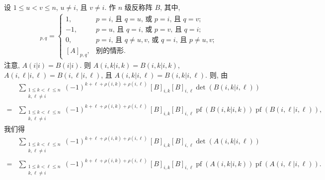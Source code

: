 \documentclass[../libro.tex]{subfiles}
\begin{document}
\begin{example}
    设 \(1 \leq u < v \leq n\),
    \(u \neq i\), 且 \(v \neq i\).
    作 \(n\) 级反称阵 \(B\),
    其中,
    \begin{align*}
        [B]_{p,q} =
        \begin{cases}
            1,
            & \text{\(p = i\), 且 \(q = u\),
            或 \(p = i\), 且 \(q = v\)};       \\
            -1,
            & \text{\(p = u\), 且 \(q = i\),
            或 \(p = v\), 且 \(q = i\)};       \\
            0,
            & \text{\(p = i\), 且 \(q \neq u, v\),
            或 \(q = i\), 且 \(p \neq u, v\)}; \\
            [A]_{p,q},
            & \text{别的情形}.
        \end{cases}
    \end{align*}
    注意, \(A(i|i) = B(i|i)\).
    则
    \(A({i,k}|{i,k}) = B({i,k}|{i,k})\),
    \(A({i,\ell}|{i,\ell}) = B({i,\ell}|{i,\ell})\),
    且
    \(A({i,k}|{i,\ell}) = B({i,k}|{i,\ell})\).
    则, 由
    \begin{align*}
        &
        \sum_{\substack{
                1 \leq k < \ell \leq n \\
        k, \ell \neq i}}
        {(-1)^{k+\ell+\rho(i,k)+\rho(i,\ell)}\,
        [B]_{i,k} [B]_{i,\ell} \det {(B({i,k}|{i,\ell}))}}
        \\
        = {} &
        \sum_{\substack{
                1 \leq k < \ell \leq n \\
        k, \ell \neq i}}
        {
            (-1)^{k+\ell+\rho(i,k)+\rho(i,\ell)}\,
            [B]_{i,k} [B]_{i,\ell}
            \operatorname{pf} {(B({i,k}|{i,k}))}
            \operatorname{pf} {(B({i,\ell}|{i,\ell}))}
        },
    \end{align*}
    我们得
    \begin{align*}
        &
        \sum_{\substack{
                1 \leq k < \ell \leq n \\
        k, \ell \neq i}}
        {(-1)^{k+\ell+\rho(i,k)+\rho(i,\ell)}\,
        [B]_{i,k} [B]_{i,\ell} \det {(A({i,k}|{i,\ell}))}}
        \\
        = {} &
        \sum_{\substack{
                1 \leq k < \ell \leq n \\
        k, \ell \neq i}}
        {
            (-1)^{k+\ell+\rho(i,k)+\rho(i,\ell)}\,
            [B]_{i,k} [B]_{i,\ell}
            \operatorname{pf} {(A({i,k}|{i,k}))}
            \operatorname{pf} {(A({i,\ell}|{i,\ell}))}
        }.
    \end{align*}

\end{example}
\end{document}
